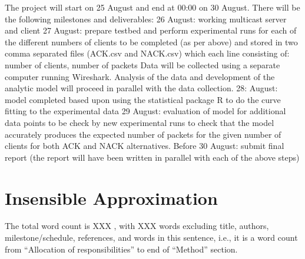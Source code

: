 \documentclass[12pt,twoside]{article}
\begin{document}
The project will start on 25 August and end at 00:00 on 30 August. There will be the following milestones and deliverables:
26 August: working multicast server and client
27 August: prepare testbed and perform experimental runs for each of the different numbers of clients to be completed (as per above) and stored in two comma separated files (ACK.csv and NACK.csv) which each line consisting of: number of clients, number of packets
Data will be collected using a separate computer running Wireshark. Analysis of the data and development of the analytic model will proceed in parallel with the data collection.
28: August: model completed based upon using the statistical package R to do the curve fitting to the experimental data
29 August: evaluation of model for additional data points to be check by new experimental runs to check that the model accurately produces the expected number of packets for the given number of clients for both ACK and NACK alternatives.
Before 30 August: submit final report (the report will have been written in parallel with each of the above steps)



\appendix
\section{Insensible Approximation}


The total word count is XXX , with XXX words excluding title, authors, milestone/schedule, references, and words in this sentence, i.e., it is a word count from “Allocation of responsibilities” to end of “Method” section.
\end{document}
